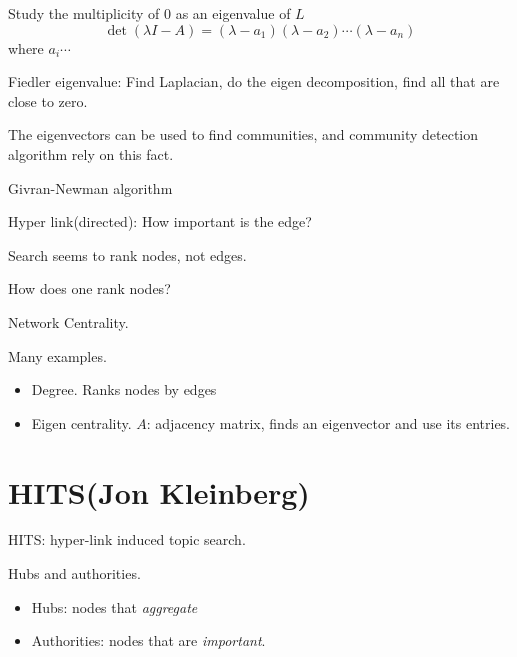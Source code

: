\begin{note}
	Study the multiplicity of \(0\) as an eigenvalue of \(L\)
	\[
		\det(\lambda I - A) = (\lambda - a_1)(\lambda - a_2)\cdots (\lambda - a_n)
	\]
	where \(a_i\cdots \)
\end{note}

\begin{definition}
	Fiedler eigenvalue:
	Find Laplacian, do the eigen decomposition, find all that are close to zero.
\end{definition}

The eigenvectors can be used to find communities, and community detection algorithm rely on this fact.

\hr

\begin{prev}
	Givran-Newman algorithm
\end{prev}
\begin{problem}
Hyper link(directed): How important is the edge?
\end{problem}
\begin{answer}
	Search seems to rank nodes, not edges.
\end{answer}

\hr

\begin{problem}
How does one rank nodes?
\end{problem}
\begin{answer}
	Network Centrality.
\end{answer}

\hr

\begin{eg}
	Many examples.
	\begin{itemize}
		\item Degree. Ranks nodes by edges
		\item Eigen centrality. \(A\): adjacency matrix, finds an eigenvector and use its entries.
	\end{itemize}
\end{eg}

\chapter{HITS(Jon Kleinberg)}
HITS: hyper-link induced topic search.

Hubs and authorities.
\begin{itemize}
	\item Hubs: nodes that \emph{aggregate}
	\item Authorities: nodes that are \emph{important}.
\end{itemize}

